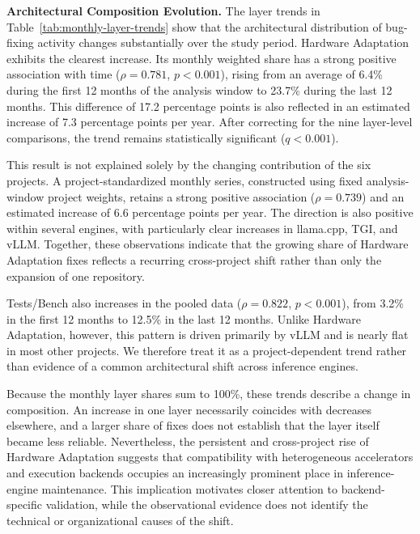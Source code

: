 \noindent\textbf{Architectural Composition Evolution.}
The layer trends in Table~\ref{tab:monthly-layer-trends} show that the architectural distribution of bug-fixing activity changes substantially over the study period. Hardware Adaptation exhibits the clearest increase. Its monthly weighted share has a strong positive association with time ($\rho=0.781$, $p<0.001$), rising from an average of 6.4\% during the first 12 months of the analysis window to 23.7\% during the last 12 months. This difference of 17.2 percentage points is also reflected in an estimated increase of 7.3 percentage points per year. After correcting for the nine layer-level comparisons, the trend remains statistically significant ($q<0.001$).

This result is not explained solely by the changing contribution of the six projects. A project-standardized monthly series, constructed using fixed analysis-window project weights, retains a strong positive association ($\rho=0.739$) and an estimated increase of 6.6 percentage points per year. The direction is also positive within several engines, with particularly clear increases in llama.cpp, TGI, and vLLM. Together, these observations indicate that the growing share of Hardware Adaptation fixes reflects a recurring cross-project shift rather than only the expansion of one repository.

Tests/Bench also increases in the pooled data ($\rho=0.822$, $p<0.001$), from 3.2\% in the first 12 months to 12.5\% in the last 12 months. Unlike Hardware Adaptation, however, this pattern is driven primarily by vLLM and is nearly flat in most other projects. We therefore treat it as a project-dependent trend rather than evidence of a common architectural shift across inference engines.

Because the monthly layer shares sum to 100\%, these trends describe a change in composition. An increase in one layer necessarily coincides with decreases elsewhere, and a larger share of fixes does not establish that the layer itself became less reliable. Nevertheless, the persistent and cross-project rise of Hardware Adaptation suggests that compatibility with heterogeneous accelerators and execution backends occupies an increasingly prominent place in inference-engine maintenance. This implication motivates closer attention to backend-specific validation, while the observational evidence does not identify the technical or organizational causes of the shift.

